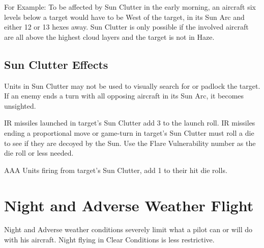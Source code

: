 \begin{advancedrules}

    For Example: To be affected by Sun Clutter in the early morning, an aircraft six levels below a target would have to be West of the target, in its Sun Arc and either 12 or 13 hexes away. Sun Clutter is only possible if the involved aircraft are all above the highest cloud layers and the target is not in Haze.

    \subsection{Sun Clutter Effects} Units in Sun Clutter may not be used to visually search for or padlock the target. If an enemy ends a turn with all opposing aircraft in its Sun Arc, it becomes unsighted.

    IR missiles launched in target's Sun Clutter add 3 to the launch roll. IR missiles ending a proportional move or game-turn in target's Sun Clutter must roll a die to see if they are decoyed by the Sun. Use the Flare Vulnerability number  as the die roll or less needed.

    AAA Units firing from target's Sun Clutter, add 1 to their hit die rolls.

    \section{Night and Adverse Weather Flight}
    \label{rule:night-and-adverse-weather-flight}
    \label{rule:adverse-conditions}

    Night and Adverse weather conditions severely limit what a pilot can or will do with his aircraft. Night flying in Clear Conditions is less restrictive.



\end{advancedrules}

